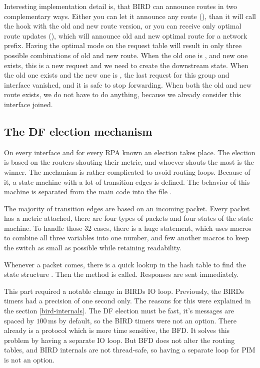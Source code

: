 Interesting implementation detail is, that BIRD can announce routes in two
complementary ways. Either you can let it announce any route (),
than it will call the  hook with the old and new route version,
or you can receive only optimal route updates (), which will
announce old and new optimal route for a network prefix. Having the optimal
mode on the request table will result in only three possible combinations of
old and new route. When the old one is \NULL, and new one exists, this is a new
request and we need to create the downstream state. When the old one exists and
the new one is \NULL, the last request for this group and interface vanished,
and it is safe to stop forwarding. When both the old and new route exists, we
do not have to do anything, because we already consider this interface joined.

\subsection{The DF election mechanism}
On every interface and for every RPA known an election takes place. The
election is based on the routers shouting their metric, and whoever shouts the
most is the winner. The mechanism is rather complicated to avoid routing loops.
Because of it, a state machine with a lot of transition edges is defined. The
behavior of this machine is separated from the main code into the file
.

The majority of transition edges are based on an incoming packet. Every packet
has a metric attached, there are four types of packets and four states of the
state machine. To handle those 32 cases, there is a huge 
statement, which uses macros to combine all three variables into one number,
and few another macros to keep the switch as small as possible while retaining
readability.

Whenever a packet comes, there is a quick lookup in the hash table to find the
state structure . Then the  method is
called. Responses are sent immediately.

This part required a notable change in BIRDs IO loop. Previously, the BIRDs
timers had a precision of one second only. The reasons for this were explained
in the section \ref{bird-internals}. The DF election must be fast, it's
messages are spaced by $100\,$ms by default, so the BIRD timers were not an
option. There already is a protocol which is more time sensitive, the BFD. It
solves this problem by having a separate IO loop. But BFD does not alter the
routing tables, and BIRD internals are not thread-safe, so having a separate
loop for PIM is not an option.

